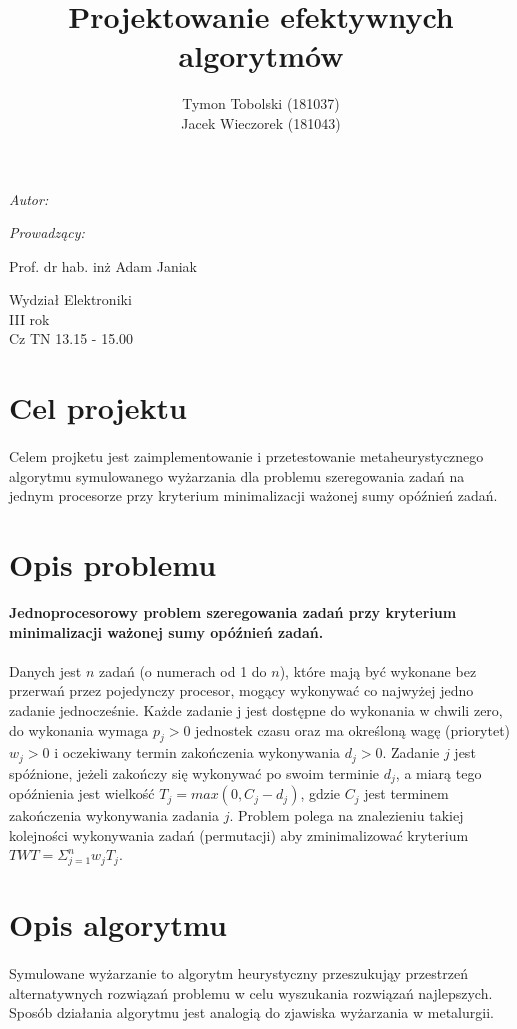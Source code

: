 \documentclass[wide,a4paper,titlepage,12pt] {article}
\title{Projektowanie efektywnych algorytmów}
\author{Tymon Tobolski (181037)\\ Jacek Wieczorek (181043)}
\makeatletter
\renewcommand{\maketitle}{
\begin{titlepage}
  \begin{center}
    \vspace*{3cm}
    \LARGE \@title \par
    \vspace{2cm}
    \textit{\small Autor:}\par
    \normalsize \@author\par \normalsize
    \vspace{3cm}
    \textit{\small Prowadzący:}\par
   Prof. dr hab. inż Adam Janiak \par
    \vspace{2cm}
    Wydział Elektroniki\\ III rok\\ Cz TN 13.15 - 15.00\par
    \vspace{4cm}
    \small \@date
  \end{center}
\end{titlepage}
}
\makeatother
\begin{document}
\maketitle
  \section{Cel projektu}
\paragraph{}
Celem projketu jest zaimplementowanie i przetestowanie metaheurystycznego algorytmu symulowanego wyżarzania dla problemu szeregowania zadań na jednym procesorze przy kryterium minimalizacji ważonej sumy opóźnień zadań.
  \section{Opis problemu}
{\bf Jednoprocesorowy problem szeregowania zadań przy kryterium
minimalizacji ważonej sumy opóźnień zadań.}
\paragraph{}
Danych jest $n$ zadań (o numerach od 1 do $n$), które mają być wykonane bez przerwań przez pojedynczy procesor, mogący wykonywać co najwyżej jedno zadanie jednocześnie.
Każde zadanie j jest dostępne do wykonania w chwili zero, do wykonania wymaga $p_{j} > 0$ jednostek czasu oraz ma określoną wagę (priorytet) $w_{j} > 0$ i oczekiwany termin zakończenia
wykonywania $d_{j} > 0$. Zadanie $j$ jest spóźnione, jeżeli zakończy się wykonywać po swoim terminie $d_{j}$, a miarą tego opóźnienia jest wielkość $T_{j} = max(0, C_{j} - d_{j} )$, gdzie $C_{j}$ jest terminem zakończenia
wykonywania zadania $j$. Problem polega na znalezieniu takiej kolejności wykonywania zadań (permutacji) aby zminimalizować kryterium $TWT = \Sigma_{j=1}^{n} w_{j} T_{j}$.
\section{Opis algorytmu}
\paragraph{}
Symulowane wyżarzanie to algorytm heurystyczny przeszukująy przestrzeń alternatywnych rozwiązań problemu w celu wyszukania rozwiązań najlepszych. Sposób działania algorytmu jest analogią do zjawiska wyżarzania w metalurgii.
\end{document}
